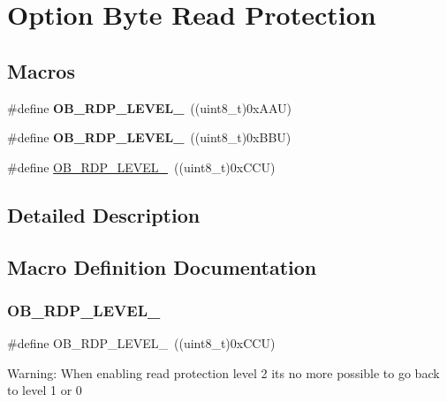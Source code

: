 \hypertarget{group___f_l_a_s_h_ex___o_b___read___protection}{}\section{Option Byte Read Protection}
\label{group___f_l_a_s_h_ex___o_b___read___protection}
\subsection*{Macros}
\begin{DoxyCompactItemize}
\item 
\mbox{\label{group___f_l_a_s_h_ex___o_b___read___protection_ga22c7871bda267a2844ab9ca9f7bd38e4}} 
\#define {\bfseries O\+B\+\_\+\+R\+D\+P\+\_\+\+L\+E\+V\+E\+L\+\_}~((uint8\+\_\+t)0x\+A\+A\+U)
\item 
\mbox{\label{group___f_l_a_s_h_ex___o_b___read___protection_ga778207f0d12d87bbff9d55e985aba5bc}} 
\#define {\bfseries O\+B\+\_\+\+R\+D\+P\+\_\+\+L\+E\+V\+E\+L\+\_}~((uint8\+\_\+t)0x\+B\+B\+U)
\item 
\#define \hyperlink{group___f_l_a_s_h_ex___o_b___read___protection_ga2262afca565429ce2808d835c49e5ee6}{O\+B\+\_\+\+R\+D\+P\+\_\+\+L\+E\+V\+E\+L\+\_}~((uint8\+\_\+t)0x\+C\+C\+U)
\end{DoxyCompactItemize}


\subsection{Detailed Description}


\subsection{Macro Definition Documentation}
\mbox{\label{group___f_l_a_s_h_ex___o_b___read___protection_ga2262afca565429ce2808d835c49e5ee6}} 
\subsubsection{\texorpdfstring{O\+B\+\_\+\+R\+D\+P\+\_\+\+L\+E\+V\+E\+L\+\_}{OB\_RDP\_LEVEL\_2}}
{\footnotesize\ttfamily \#define O\+B\+\_\+\+R\+D\+P\+\_\+\+L\+E\+V\+E\+L\+\_~((uint8\+\_\+t)0x\+C\+C\+U)}

Warning\+: When enabling read protection level 2 it\textquotesingle{}s no more possible to go back to level 1 or 0 